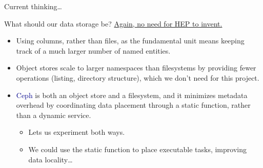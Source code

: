 \documentclass[aspectratio=169]{beamer}
\begin{document}
\begin{frame}{Current thinking\ldots}
\vspace{0.5 cm}
\begin{center}
\end{center}
\end{frame}

\begin{frame}{What should our data storage be?}
\vspace{0.5 cm}
\underline{Again, no need for HEP to invent.}

\vspace{0.25 cm}
\begin{itemize}\setlength{\itemsep}{0.25 cm}
\item<2-> Using columns, rather than files, as the fundamental unit means keeping track of a much larger number of named entities.

\item<3-> Object stores scale to larger namespaces than filesystems by providing fewer operations (listing, directory structure), which we don't need for this project.

\item<4-> \textcolor{darkblue}{Ceph} is both an object store and a filesystem, and it minimizes metadata overhead by coordinating data placement through a static function, rather than a dynamic service.

\begin{itemize}
\item<5-> Lets us experiment both ways.

\item<5-> We could use the static function to place executable tasks, improving data locality\ldots
\end{itemize}
\end{itemize}
\end{frame}
\end{document}
